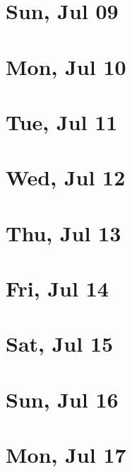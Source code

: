 	\section{Sun, Jul 09}
		
		
	\section{Mon, Jul 10}
		
		
	\section{Tue, Jul 11}
		
		
	\section{Wed, Jul 12}
		
		
	\section{Thu, Jul 13}
		
		
	\section{Fri, Jul 14}
		
		
	\section{Sat, Jul 15}
		
		
	\section{Sun, Jul 16}
		
		
	\section{Mon, Jul 17}
		
		
